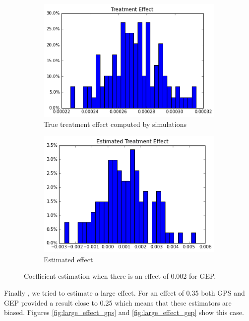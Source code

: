 \documentclass[11pt]{article}
\begin{document}
\begin{figure}[h]
\centering
\begin{subfigure}{.5\textwidth}
  \centering
  \includegraphics[width=.9\linewidth]{treatment_effect_no_influence.png}
  \caption{True treatment effect computed by simulations}
  \label{fig:sub1}
\end{subfigure}%
\begin{subfigure}{.5\textwidth}
  \centering
  \includegraphics[width=.9\linewidth]{estimated_small_effect_gep.png}
  \caption{Estimated effect}
  \label{fig:sub2}
\end{subfigure}
\caption{Coefficient estimation when there is an effect of 0.002 for GEP.}
\label{fig:small_effect_gep}
\end{figure}

\FloatBarrier

Finally , we  tried to estimate a large effect. For an effect of 0.35 both GPS and GEP provided a result close to 0.25 which means that these estimators are biased.   Figures \ref{fig:large_effect_gps} and \ref{fig:large_effect_gep} show this case. 
\end{document}
